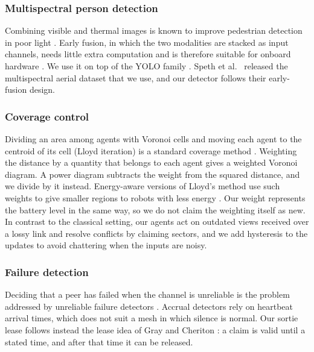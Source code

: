 \documentclass[10pt,letterpaper]{article}
\begin{document}
\subsubsection*{Multispectral person detection}
Combining visible and thermal images is known to improve pedestrian detection in poor light \cite{hwang2015kaist,jia2021llvip}. Early fusion, in which the two modalities are stacked as input channels, needs little extra computation and is therefore suitable for onboard hardware \cite{speth2022}. We use it on top of the YOLO family \cite{redmon2016yolo,jocher2024yolo11}. Speth et al.\ \cite{speth2022} released the multispectral aerial dataset that we use, and our detector follows their early-fusion design.

\subsubsection*{Coverage control}
Dividing an area among agents with Voronoi cells and moving each agent to the centroid of its cell (Lloyd iteration) is a standard coverage method \cite{lloyd1982,du1999cvt,cortes2004coverage}. Weighting the distance by a quantity that belongs to each agent gives a weighted Voronoi diagram. A power diagram \cite{aurenhammer1987power} subtracts the weight from the squared distance, and we divide by it instead. Energy-aware versions of Lloyd's method use such weights to give smaller regions to robots with less energy \cite{kwok2007,munir2024}. Our weight represents the battery level in the same way, so we do not claim the weighting itself as new. In contrast to the classical setting, our agents act on outdated views received over a lossy link and resolve conflicts by claiming sectors, and we add hysteresis to the updates to avoid chattering when the inputs are noisy.

\subsubsection*{Failure detection}
Deciding that a peer has failed when the channel is unreliable is the problem addressed by unreliable failure detectors \cite{chandra1996}. Accrual detectors \cite{hayashibara2004} rely on heartbeat arrival times, which does not suit a mesh in which silence is normal. Our sortie lease follows instead the lease idea of Gray and Cheriton \cite{gray1989}: a claim is valid until a stated time, and after that time it can be released.
\end{document}
